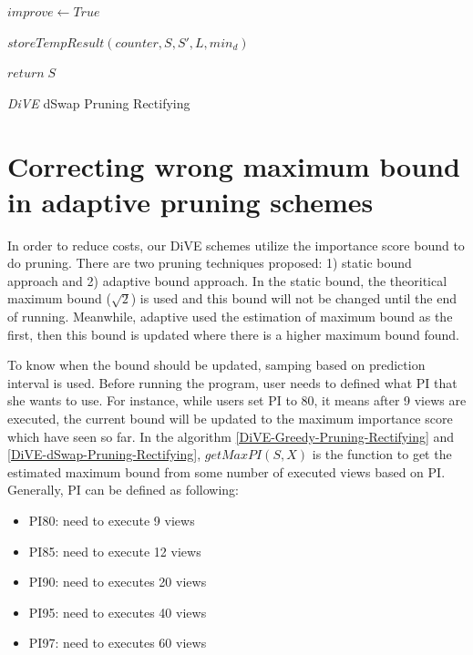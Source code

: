 \documentclass{article}
\begin{document}
\begin{algorithm}
{{			$  improve \leftarrow  True $\;
			
			
		}{
		
			$ storeTempResult(counter, S, S', L, min_d)$\;



}
	

	
		
	}
	$return\; S$
	\caption{\textit{DiVE} dSwap Pruning Rectifying}\label{DiVE-dSwap-Pruning-Rectifying}
\end{algorithm}




\section{Correcting wrong maximum bound in adaptive pruning schemes}


In order to reduce costs, our DiVE schemes utilize the importance score bound to do pruning. There are two pruning techniques proposed: 1) static bound approach and 2) adaptive bound approach. In the static bound, the theoritical maximum bound ($ \sqrt{2} $) is used and this bound will not be changed until the end of running. Meanwhile, adaptive used the estimation of maximum bound as the first, then this bound is updated where there is a higher maximum bound found. 


To know when the bound should be updated, samping based on prediction interval is used. Before running the program, user needs to defined what PI that she wants to use. For instance, while users set PI to 80, it means after 9 views are executed, the current bound will be updated to the maximum importance score which have seen so far. In the algorithm \ref{DiVE-Greedy-Pruning-Rectifying} and \ref{DiVE-dSwap-Pruning-Rectifying}, $getMaxPI(S,X)$ is the function to get the estimated maximum bound from some number of executed views based on PI. Generally, PI can be defined as following: 

\begin{itemize}[noitemsep]
	\item PI80: need to execute 9 views
	\item PI85: need to execute 12 views
	\item PI90: need to executes 20 views
	\item PI95: need to executes 40 views
	\item PI97: need to executes 60 views
\end{itemize}
\end{document}

